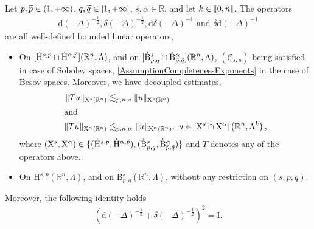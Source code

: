 \documentclass[10pt]{amsart}
\theoremstyle{definition}\newtheorem{defi}[theo]{Definition}\newtheorem{rema}[theo]{Remark}\newtheorem{exam}[theo]{Example}\newtheorem{exem}[theo]{Example}\newtheorem{nota}[theo]{Notation}
\newcommand{\bbR}{\mathbb{R}}
\newcommand{\rmH}{\mathrm{H}}%
\newcommand{\rmB}{\mathrm{B}}
\newcommand{\rmd}{\mathrm{d}}
\newcommand{\rmX}{\mathrm{X}}
\newcommand{\rmI}{\mathrm{I}}
\newcommand{\clC}{\mathcal{C}}
\newcommand{\llbracket}{\mathopen{[\mkern -2.7mu[}}
\newcommand{\rrbracket}{\mathclose{]\mkern -2.7mu]}}
\newcommand{\llb}{\llbracket}
\newcommand{\rrb}{\rrbracket}
\let\oldtilde\tilde
\renewcommand*{\tilde}[1]{\mathchoice{\widetilde{#1}}{\widetilde{#1}}{\oldtilde{#1}}{\oldtilde{#1}}}
\begin{document}
\begin{prop}\label{prop:RiesTransformHodgeRn}
Let $p,\Tilde{p}\in(1,+\infty)$, $q,\Tilde{q}\in[1,+\infty]$, $s,\alpha\in\bbR$, and let $k\in\llb 0,n\rrb$. The operators
\begin{align*}
\rmd(-\Delta)^{-\frac{1}{2}}, \delta(-\Delta)^{-\frac{1}{2}}, \rmd\delta(-\Delta)^{-1} \text{ and } \delta\rmd(-\Delta)^{-1}
\end{align*}
are all well-defined bounded linear operators,
\begin{itemize}
\item On $[\dot{\rmH}^{s,p}\cap \dot{\rmH}^{\alpha,\tilde{p}}](\bbR^n,\Lambda)$, and on $[\dot{\rmB}^{s}_{p,q}\cap \dot{\rmB}^{\alpha}_{\tilde{p},\tilde{q}}](\bbR^n,\Lambda)$, $(\clC_{s,p})$ being satisfied in case of Sobolev spaces, \eqref{AssumptionCompletenessExponents} in the case of Besov spaces. Moreover, we have decoupled estimates,
\begin{align*}
\| T u \|_{\rmX^s(\bbR^n)} &\lesssim_{p,n,s} \| u \|_{\rmX^s(\bbR^n)}\\
\intertext{and} 
\| T u \|_{\rmX^\alpha(\bbR^n)} &\lesssim_{p,n,\alpha} \| u \|_{\rmX ^\alpha(\bbR^n)}\text{, }\, u\in [\rmX^s\cap \rmX^\alpha]\left(\bbR^n,\Lambda^k\right)\text{,}
\end{align*}
where $(\rmX^s, \rmX^\alpha) \in\{ (\dot{\rmH}^{s,p},\dot{\rmH}^{\alpha,\tilde{p}}), (\dot{\rmB}^{s}_{p,q},\dot{\rmB}^{\alpha}_{\tilde{p},\tilde{q}})\}$ and $T$ denotes any of the operators above.
\item On ${\rmH}^{s,p}(\bbR^n,\Lambda)$, and on ${\rmB}^{s}_{p,q}(\bbR^n,\Lambda)$, without any restriction on $(s,p,q)$.
\end{itemize}
Moreover, the following identity holds
\begin{align*}
\left(\rmd(-\Delta)^{-\frac{1}{2}}+ \delta(-\Delta)^{-\frac{1}{2}}\right)^2 = \rmI .
\end{align*}
\end{prop}
\end{document}
